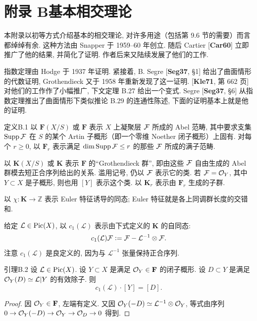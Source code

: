 \chapter*{附录 B\quad 基本相交理论}\label{appB}
\begingroup
\newcommand{\BF}{\mathbf F}
\newcommand{\BK}{\mathbf K}
\newcommand{\BL}{\mathcal L}
\newcommand{\BM}{\mathcal M}

本附录以初等方式介绍基本的相交理论, 对许多用途（包括第 9.6 节的需要）而言都绰绰有余. 这种方法由 Snapper 于 1959--60 年创立. 随后 Cartier [\textbf{Car60}] 立即推广了他的结果, 并简化了证明. 作者后来又陆续发展了他们的工作.

指数定理由 Hodge 于 1937 年证明. 紧接着, B. Segre [\textbf{Seg37}, §1] 给出了曲面情形的代数证明, Grothendieck 又于 1958 年重新发现了这一证明. [\textbf{Kle71}, 第 662 页] 对他们的工作作了小幅推广, 下文定理 B.27 给出一个变式. Segre [\textbf{Seg37}, §6] 从指数定理推出了曲面情形下类似推论 B.29 的连通性陈述, 下面的证明基本上就是他的证明.

\begin{origstatement}{定义}{B.1}\label{appB:1}
以 $\BF(X/S)$ 或 $\BF$ 表示 $X$ 上凝聚层 $\mathcal F$ 所成的 Abel 范畴, 其中要求支集 $\operatorname{Supp}\mathcal F$ 在 $S$ 的某个 Artin 子概形（即一个零维 Noether 闭子概形）上固有. 对每个 $r\ge0$, 以 $\BF_r$ 表示满足 $\dim\operatorname{Supp}\mathcal F\le r$ 的那些 $\mathcal F$ 所成的满子范畴.

以 $\BK(X/S)$ 或 $\BK$ 表示 $\BF$ 的“Grothendieck 群”, 即由这些 $\mathcal F$ 自由生成的 Abel 群模去短正合序列给出的关系. 滥用记号, 仍以 $\mathcal F$ 表示它的类. 若 $\mathcal F=\mathcal O_Y$, 其中 $Y\subset X$ 是子概形, 则也用 $[Y]$ 表示这个类. 以 $\BK_r$ 表示由 $\BF_r$ 生成的子群.

以 $\chi\colon\BK\to\mathbb Z$ 表示 Euler 特征诱导的同态; Euler 特征就是各上同调群长度的交错和.

给定 $\BL\in\Pic(X)$, 以 $c_1(\BL)$ 表示由下式定义的 $\BK$ 的自同态:
\[c_1(\BL)\cF\defeq\cF-\BL^{-1}\otimes\cF.\]
注意 $c_1(\BL)$ 是良定义的, 因为与 $\BL^{-1}$ 张量保持正合序列.
\end{origstatement}

\begin{origstatement}{引理}{B.2}\label{appB:2}
设 $\BL\in\Pic(X)$. 设 $Y\subset X$ 是满足 $\cO_Y\in\BF$ 的闭子概形. 设 $D\subset Y$ 是满足 $\cO_Y(D)\simeq\BL|Y$ 的有效除子. 则
\[c_1(\BL)\cdot[Y]=[D].\]
\end{origstatement}
\begin{proof}
因 $\cO_Y\in\BF$, 左端有定义. 又因 $\cO_Y(-D)\simeq\BL^{-1}\otimes\cO_Y$, 等式由序列 $0\to\mathcal O_Y(-D)\to\mathcal O_Y\to\mathcal O_D\to0$ 得到.
\end{proof}

